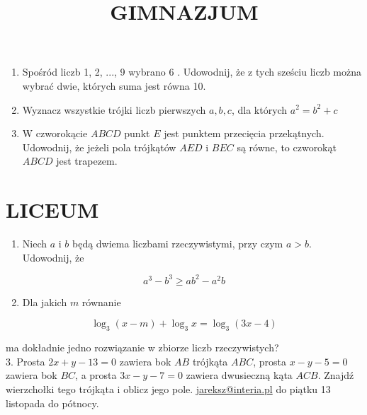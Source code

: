 \documentclass[10pt]{article}
\title{GIMNAZJUM }
\author{}
\date{}
\begin{document}
\maketitle
\begin{enumerate}
  \item Spośród liczb 1, 2, ..., 9 wybrano 6 . Udowodnij, że z tych sześciu liczb można wybrać dwie, których suma jest równa 10.
  \item Wyznacz wszystkie trójki liczb pierwszych \(a, b, c\), dla których \(a^{2}=b^{2}+c\)
  \item W czworokącie \(A B C D\) punkt \(E\) jest punktem przecięcia przekątnych. Udowodnij, że jeżeli pola trójkątów \(A E D\) i \(B E C\) są równe, to czworokąt \(A B C D\) jest trapezem.
\end{enumerate}

\section*{LICEUM}
\begin{enumerate}
  \item Niech \(a\) i \(b\) będą dwiema liczbami rzeczywistymi, przy czym \(a>b\). Udowodnij, że
\end{enumerate}

\[
a^{3}-b^{3} \geq a b^{2}-a^{2} b
\]

\begin{enumerate}
  \setcounter{enumi}{1}
  \item Dla jakich \(m\) równanie
\end{enumerate}

\[
\log _{3}(x-m)+\log _{3} x=\log _{3}(3 x-4)
\]

ma dokładnie jedno rozwiązanie w zbiorze liczb rzeczywistych?\\
3. Prosta \(2 x+y-13=0\) zawiera bok \(A B\) trójkąta \(A B C\), prosta \(x-y-5=0\) zawiera bok \(B C\), a prosta \(3 x-y-7=0\) zawiera dwusieczną kąta \(A C B\). Znajdź wierzchołki tego trójkąta i oblicz jego pole. \href{mailto:jareksz@interia.pl}{jareksz@interia.pl} do piątku 13 listopada do pótnocy.
\end{document}
